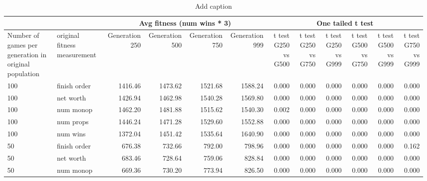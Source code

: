 \clearpage
\begin{landscape}
\thispagestyle{empty}
\setcounter{secnumdepth}{0}
\label{sec:appendixB}

\begin{table}[ht]
  \centering
  \caption{Add caption}
    \begin{tabularx}{\linewidth}{|p{1in}|p{1in}|r|r|r|r|r|r|r|r|r|r|}
\cline{3-12}    \multicolumn{1}{l}{} &  & \multicolumn{4}{c|}{Avg fitness (num wins * 3)} & \multicolumn{6}{c|}{One tailed t test} \\ \hline
    Number of games per generation in original population & original fitness measurement 
    & \multicolumn{1}{p{0.7in}|}{Generation 250} 
    & \multicolumn{1}{p{0.7in}|}{Generation 500}
    & \multicolumn{1}{p{0.7in}|}{Generation 750}
    & \multicolumn{1}{p{0.7in}|}{Generation 999}
    & \multicolumn{1}{X|}{t test G250 vs G500} 
    & \multicolumn{1}{X|}{t test G250 vs G750}
    & \multicolumn{1}{X|}{t test G250 vs G999}
    & \multicolumn{1}{X|}{t test G500 vs G750}
    & \multicolumn{1}{X|}{t test G500 vs G999}
    & \multicolumn{1}{X|}{t test G750 vs G999} \\ \hline
    100    & finish order & 1416.46 & 1473.62 & 1521.68 & 1588.24 & 0.000  & 0.000  & 0.000  & 0.000  & 0.000  & 0.000 \\ \hline
    100    & net worth & 1426.94 & 1462.98 & 1540.28 & 1569.80 & 0.000  & 0.000  & 0.000  & 0.000  & 0.000  & 0.000 \\ \hline
    100    & num monop & 1462.20 & 1481.88 & 1515.62 & 1540.30 & 0.002  & 0.000  & 0.000  & 0.000  & 0.000  & 0.000 \\ \hline
    100    & num props & 1446.24 & 1471.28 & 1529.60 & 1552.88 & 0.000  & 0.000  & 0.000  & 0.000  & 0.000  & 0.000 \\ \hline
    100    & num wins & 1372.04 & 1451.42 & 1535.64 & 1640.90 & 0.000  & 0.000  & 0.000  & 0.000  & 0.000  & 0.000 \\ \hline
    50     & finish order & 676.38 & 732.66 & 792.00 & 798.96 & 0.000  & 0.000  & 0.000  & 0.000  & 0.000  & 0.162 \\ \hline
    50     & net worth & 683.46 & 728.64 & 759.06 & 828.84 & 0.000  & 0.000  & 0.000  & 0.000  & 0.000  & 0.000 \\ \hline
    50     & num monop & 669.36 & 730.20 & 773.94 & 826.50 & 0.000  & 0.000  & 0.000  & 0.000  & 0.000  & 0.000 \\ \hline

\end{tabularx}
\end{table}
\end{landscape}
